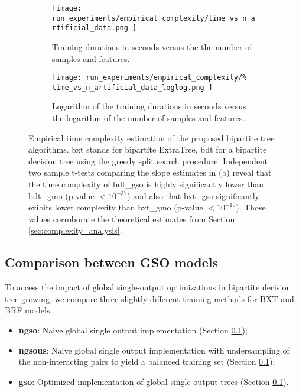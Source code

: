 \begin{figure}[h]
    \centering
    \begin{subfigure}{0.5\textwidth}
        \texttt{[image: 
            run\_experiments/empirical\_complexity/time\_vs\_n\_artificial\_data.png
        ]}
        \caption{Training durations in seconds versus the the number of samples and features.}
    \end{subfigure}
    \begin{subfigure}{0.5\textwidth}
        \texttt{[image: 
            run\_experiments/empirical\_complexity/\%
            time\_vs\_n\_artificial\_data\_loglog.png
        ]}
        \caption{Logarithm of the training durations in seconds versus the logarithm of the number of samples and features.}
    \end{subfigure}
    \caption{
        Empirical time complexity estimation of the proposed bipartite tree
        algorithms. bxt stands for bipartite ExtraTree, bdt for a bipartite decision tree using the greedy split search procedure. Independent two sample t-tests comparing the slope estimates in (b) reveal that the time complexity of bdt\_gso is highly significantly lower than bdt\_gmo (p-value $< 10^{-37}$) and also that bxt\_gso significantly exibits lower complexity than bxt\_gmo (p-value $< 10^{-19}$). Those values
        corroborate the theoretical estimates from Section \ref{sec:complexity_analysis}.
    }
    \label{fig:empirical_complexity}
\end{figure}

\subsection{Comparison between GSO models}

To access the impact of global single-output optimizations in bipartite decision tree growing, we compare three slightly different training methods for BXT and BRF models.

\begin{itemize}
    \item \textbf{ngso}: Naive global single output implementation (Section \ref{});
    \item \textbf{ngsous}: Naive global single output implementation with undersampling of the non-interacting pairs to yield a balanced training set (Section \ref{});
    \item \textbf{gso}: Optimized implementation of global single output trees (Section \ref{}).
\end{itemize}

